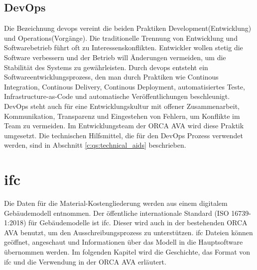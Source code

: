 \subsection{DevOps}
\label{c:basics:project-management:devops}
Die Bezeichnung \ac{devops} vereint die beiden Praktiken \glqq Development\grqq{}(Entwicklung) und \glqq Operations\grqq{}(Vorgänge). Die traditionelle Trennung von Entwicklung und Softwarebetrieb führt oft zu
Interessenskonflikten. Entwickler wollen stetig die Software verbessern und der Betrieb will Änderungen vermeiden, um die Stabilität des Systems zu gewährleisten. Durch \ac{devops} entsteht ein Softwareentwicklungsprozess, den man durch Praktiken wie Continous Integration, Continous Delivery, Continous Deployment, automatisiertes Teste, Infrastructure-as-Code und automatische Veröffentlichungen beschleunigt. DevOps steht auch für eine Entwicklungskultur mit offener Zusammenarbeit, Kommunikation, Transparenz und Eingestehen von Fehlern, um Konflikte im Team zu vermeiden. \citep{devops_2021} Im Entwicklungsteam der ORCA AVA wird diese Praktik umgesetzt. Die technischen Hilfsmittel, die für den DevOps Prozess verwendet werden, sind in Abschnitt \ref{c:qs:technical_aids} beschrieben.

\section{\ac{ifc}}
\label{c:basics:ifc}
Die Daten für die Material-Kostengliederung werden aus einem digitalem Gebäudemodell entnommen. Der öffentliche internationale Standard (ISO 16739-1:2018) für Gebäudemodelle ist \ac{ifc}. \citep{BuildingSMART_IFC4_doc} Dieser wird auch in der bestehenden ORCA AVA benutzt, um den Ausschreibungsprozess zu unterstützen. \ac{ifc} Dateien können geöffnet, angeschaut und Informationen über das Modell in die Hauptsoftware übernommen werden. Im folgenden Kapitel wird die Geschichte, das Format von \ac{ifc} und die Verwendung in der ORCA AVA erläutert.

